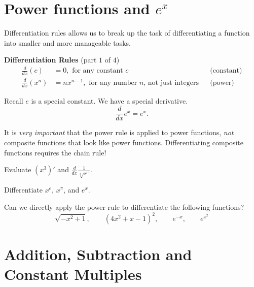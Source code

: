 \documentclass[../main.tex]{subfiles}
\begin{document}

\section{Power functions and \texorpdfstring{\(e^{x}\)}{exp(x)}}

Differentiation rules allows us to break up the task of differentiating a function into smaller and more manageable tasks.

\begin{mdframed}[style=simple]
  \textbf{Differentiation Rules} \hfill {\footnotesize (part \(1\) of \(4\))}
  \begin{align*}
    \frac{d}{dx} (c)
    &= 0, \text{ for any constant \(c\)}
    && \text{(constant)} \\[1em]
    \frac{d}{dx} (x^{n})
    &= n x^{n-1}, \text{ for any number \(n\), not just integers} 
    && \text{(power)} 
  \end{align*}

  Recall \(e\) is a special constant. We have a special derivative. 
  \[ 
    \frac{d}{dx} e^{x} = e^{x}.
  \]
\end{mdframed}

\faExclamationTriangle{} It is \emph{very important} that the power rule is applied to power functions, \emph{not} composite functions that look like power functions. Differentiating composite functions requires the chain rule! 

\begin{example}
  Evaluate \((x^{3})'\) and \(\frac{d}{dx}\frac{1}{\sqrt[3]{x}^{5}}\).
\end{example}
\vfill

\begin{example}
  Differentiate \(x^{e}\), \(x^{\pi}\), and \(e^{x}\).
\end{example}
\vfill

\begin{example}
  Can we directly apply the power rule to differentiate the following functions?
  \[
    \sqrt{-x^{2} + 1}, \qquad (4x^{2} + x - 1)^{2}, \qquad e^{-x}, \qquad e^{x^{2}}
  \]
\end{example}
\vspace{1cm}
\clearpage

\section{Addition, Subtraction and Constant Multiples}
\end{document}
